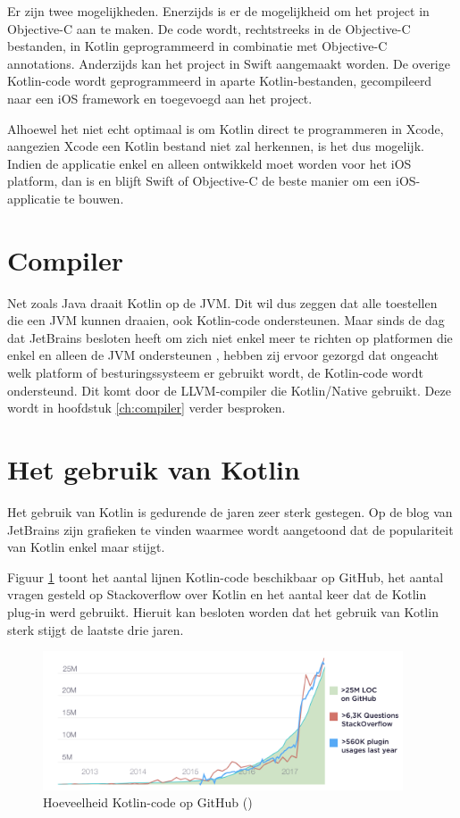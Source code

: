 Er zijn twee mogelijkheden. Enerzijds is er de mogelijkheid om het project in Objective-C aan te maken. De code wordt, rechtstreeks in de Objective-C bestanden, in Kotlin geprogrammeerd in combinatie met Objective-C annotations. Anderzijds kan het project in Swift aangemaakt worden. De overige Kotlin-code wordt geprogrammeerd in aparte Kotlin-bestanden, gecompileerd naar een iOS framework en toegevoegd aan het project.

Alhoewel het niet echt optimaal is om Kotlin direct te programmeren in Xcode, aangezien Xcode een Kotlin bestand niet zal herkennen, is het dus mogelijk. Indien de applicatie enkel en alleen ontwikkeld moet worden voor het iOS platform, dan is en blijft Swift of Objective-C de beste manier om een iOS-applicatie te bouwen.

\section{Compiler}
\label{sec:llvm}
Net zoals Java draait Kotlin op de JVM. Dit wil dus zeggen dat alle toestellen die een JVM kunnen draaien, ook Kotlin-code ondersteunen. Maar sinds de dag dat JetBrains besloten heeft om zich niet enkel meer te richten op platformen die enkel en alleen de JVM ondersteunen \autocite{JetBrainsVM}, hebben zij ervoor gezorgd dat ongeacht welk platform of besturingssysteem er gebruikt wordt, de Kotlin-code wordt ondersteund. Dit komt door de LLVM-compiler die Kotlin/Native gebruikt. Deze wordt in hoofdstuk \ref{ch:compiler} verder besproken.

\section{Het gebruik van Kotlin}
\label{sec:kotlingebruik}
Het gebruik van Kotlin is gedurende de jaren zeer sterk gestegen. Op de blog van JetBrains \autocite{JetBrains12} zijn grafieken te vinden waarmee wordt aangetoond dat de populariteit van Kotlin enkel maar stijgt.

Figuur \ref{fig:kotlingithub} toont het aantal lijnen Kotlin-code beschikbaar op GitHub, het aantal vragen gesteld op Stackoverflow over Kotlin en het aantal keer dat de Kotlin plug-in werd gebruikt. Hieruit kan besloten worden dat het gebruik van Kotlin sterk stijgt de laatste drie jaren.

\begin{figure} [ht]
	\centering
	\includegraphics[width=0.95\textwidth]{img/KotlinAdoption.png}
	\caption{Hoeveelheid Kotlin-code op GitHub (\cite{JetBrains12})}
	\label{fig:kotlingithub}
\end{figure}

